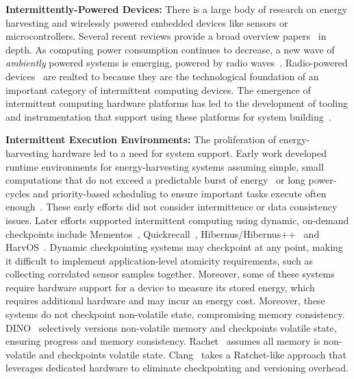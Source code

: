 \noindent \textbf{Intermittently-Powered Devices:} There is a large body of
research on energy harvesting and wirelessly powered embedded devices like
sensors or microcontrollers. Several recent reviews provide a broad overview
papers~\cite{prasad_comst_2014,sample_procieee_2013,huang:commag:2015,visser_procieee_2013,kamalinejad_commag_2015,ku_cst_2016}
in depth.  As computing power consumption continues to decrease, a new wave of
{\em ambiently} powered systems is emerging, powered by radio
waves~\cite{patel_pervasive_2017,rf_powered_computing_gollakota_2014}.
Radio-powered
devices~\cite{wisp5,moo,zhao_rfid_2015,holleman_biocas_2008,thomas_jbcs_2012,naderiparizi_rfid_2015,rodriguez_tbcs_2015,liu_sigcomm_2013,kicksat,nadeau_naturebio_2017}
are realted to \sys because they are the technological foundation of an
important category of intermittent computing devices. The emergence of
intermittent computing hardware platforms has led to the development of tooling
and instrumentation that support using these platforms for system
building~\cite{hester_sensys_2014,hester_sensys_2015,edb,stork,wisent}.

\noindent \textbf{Intermittent Execution Environments:} 
The proliferation of energy-harvesting hardware led to a need for system
support.  Early work developed runtime environments for energy-harvesting
systems assuming simple, small computations that do not exceed a predictable
burst of energy~\cite{dewdrop} or long power-cycles and priority-based
scheduling to ensure important tasks execute often
enough~\cite{sorber_sensys_2007}.  These early efforts did not consider
intermittence or data consistency issues. 
%
Later efforts supported intermittent computing using dynamic, on-demand
checkpoints include Mementos~\cite{mementos}, Quickrecall~\cite{quickrecall},
Hibernus/Hibernus++~\cite{hibernus,hibernusplusplus} and
HarvOS~\cite{mottola2017harvos}. Dynamic checkpointing systems may checkpoint
at any point, making it difficult to implement application-level atomicity
requirements, such as collecting correlated sensor samples together.  Moreover,
some of these systems require hardware support for a device to measure its
stored energy, which requires additional hardware and may incur an energy cost. 
Moreover, these systems do not checkpoint non-volatile state, compromising 
memory consistency.
%
DINO~\cite{dino} selectively versions non-volatile memory and checkpoints
volatile state, ensuring progress and memory consistency.
Rachet~\cite{ratchet} assumes all memory is non-volatile and checkpoints
volatile state.  Clang~\cite{hicks_isca_2017} takes a Ratchet-like approach
that leverages dedicated hardware to eliminate checkpointing and versioning
overhead. 

